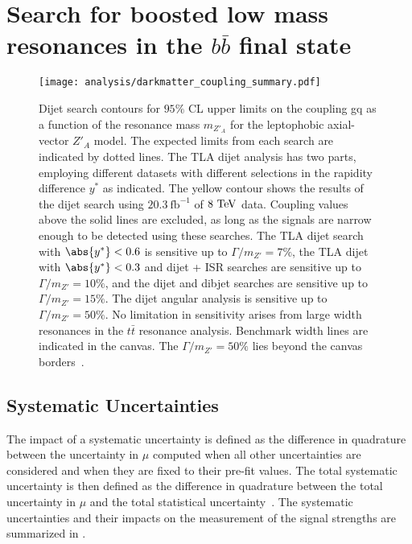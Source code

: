 \chapter{Search for boosted low mass resonances in the $b\bar{b}$ final state}\label{chapter:analysis}

\begin{figure}[htbp]
 \centering
 \texttt{[image: analysis/darkmatter\_coupling\_summary.pdf]}
 \caption{Dijet search contours for $95\%$ CL upper limits on the coupling gq as a function of the resonance mass $m_{Z'_{A}}$ for the leptophobic axial-vector $Z'_{A}$ model.
 The expected limits from each search are indicated by dotted lines.
 The TLA dijet analysis has two parts, employing different datasets with different selections in the rapidity difference $y^{*}$ as indicated.
 The yellow contour shows the results of the dijet search using $20.3~\mathrm{fb}^{-1}$ of $8~\mathrm{TeV}$ data.
 Coupling values above the solid lines are excluded, as long as the signals are narrow enough to be detected using these searches.
 The TLA dijet search with $\abs{y^{*}} < 0.6$ is sensitive up to $\Gamma/m_{Z'} = 7\%$, the TLA dijet with $\abs{y^{*}} < 0.3$ and dijet + ISR searches are sensitive up to $\Gamma/m_{Z'} = 10\%$, and the dijet and dibjet searches are sensitive up to $\Gamma/m_{Z'} = 15\%$.
 The dijet angular analysis is sensitive up to $\Gamma/m_{Z'} = 50\%$.
 No limitation in sensitivity arises from large width resonances in the $t\bar{t}$ resonance analysis.
 Benchmark width lines are indicated in the canvas.
 The $\Gamma/m_{Z'} = 50\%$ lies beyond the canvas borders~\cite{Zprime_gq_limit_public_plot}.}
 \label{fig:darkmatter_coupling_summary}
\end{figure}

\section{Systematic Uncertainties}\label{sec:systematic_uncertainties}

The impact of a systematic uncertainty is defined as the difference in quadrature between the uncertainty in $\mu$ computed when all other uncertainties are considered and when they are fixed to their pre-fit values.
The total systematic uncertainty is then defined as the difference in quadrature between the total uncertainty in $\mu$ and the total statistical uncertainty~\cite{ATLAS-CONF-2018-052}.
The systematic uncertainties and their impacts on the measurement of the signal strengths are summarized in .

